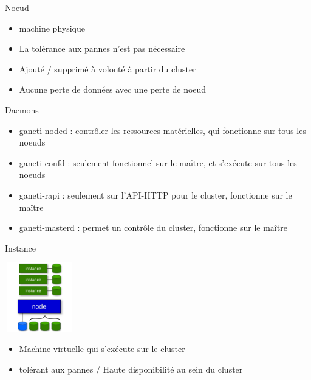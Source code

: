 \begin{frame}{Noeud}
\begin{itemize}
\item machine physique

\item La tolérance aux pannes n'est pas nécessaire

\item Ajouté / supprimé à volonté à partir du cluster

\item Aucune perte de données avec une perte de noeud
\end{itemize}
\end{frame}

\begin{frame}{Daemons}
\begin{itemize}
\item ganeti-noded : contrôler les ressources matérielles, qui fonctionne sur tous les noeuds

\item ganeti-confd : seulement fonctionnel sur le maître, et s'exécute sur tous les noeuds

\item ganeti-rapi : seulement sur l'API-HTTP  pour le cluster, fonctionne sur le maître

\item ganeti-masterd :  permet un contrôle du cluster, fonctionne sur le maître
\end{itemize}
\end{frame}

\begin{frame}{Instance}
\begin{center}
  \includegraphics[width=3cm,height=3cm]{images_presentation/instance.png}
\end{center}
\begin{itemize}
\item Machine virtuelle qui s'exécute sur le cluster

\item tolérant aux pannes / Haute disponibilité au sein du cluster
\end{itemize}
\end{frame}

